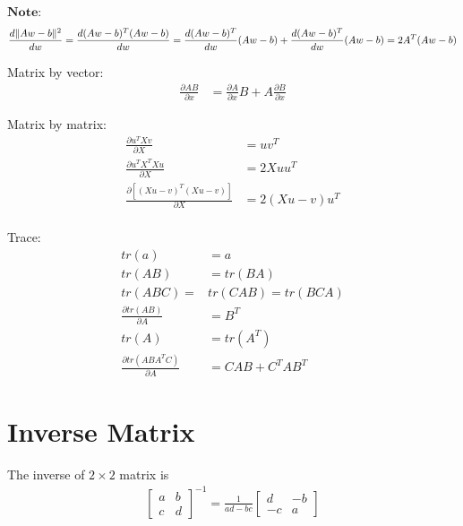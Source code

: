 \documentclass[11pt]{elegantbook}
\begin{document}
$\textbf{Note:}$ $$\frac{d\|Aw-b\|^2}{dw}
=\frac{d(Aw-b)^T(Aw-b)}{dw}
\\=\frac{d(Aw-b)^T}{dw}(Aw-b)+\frac{d(Aw-b)^T}{dw}(Aw-b)
\\=2A^T(Aw-b)$$

Matrix by vector:
\begin{equation}
    \begin{aligned}
        \frac{\partial AB}{\partial x}&=\frac{\partial A}{\partial x}B+A\frac{\partial B}{\partial x}
    \end{aligned}
    \nonumber
\end{equation}

Matrix by matrix:
\begin{equation}
    \begin{aligned}
        \frac{\partial u^TXv}{\partial X}&=uv^T\\
        \frac{\partial u^TX^TXu}{\partial X}&=2Xuu^T\\
        \frac{\partial [(Xu-v)^T(Xu-v)]}{\partial X}&=2(Xu-v)u^T\\
    \end{aligned}
    \nonumber
\end{equation}

Trace:
\begin{equation}
    \begin{aligned}
        tr(a)&=a\\
        tr(AB)&=tr(BA)\\
        tr(ABC)=&tr(CAB)=tr(BCA)\\
        \frac{\partial tr(AB)}{\partial A}&=B^T\\
        tr(A)&=tr(A^T)\\
        \frac{\partial tr(ABA^TC)}{\partial A}&=CAB+C^TAB^T
    \end{aligned}
    \nonumber
\end{equation}

\section{Inverse Matrix}
\begin{proposition}
    The inverse of $2\times 2$ matrix is
    \begin{equation}
        \begin{aligned}
            \begin{bmatrix}
                a&b\\
                c&d
            \end{bmatrix}^{-1}
            =\frac{1}{ad-bc}
            \begin{bmatrix}
                d&-b\\
                -c&a
            \end{bmatrix}
        \end{aligned}
        \nonumber
    \end{equation}
\end{proposition}
\end{document}
